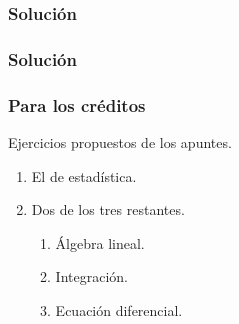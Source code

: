 \documentclass[12pt]{beamer}
\begin{document}
\begin{frame}\frametitle{Solución}
\testcode
\end{frame}


\begin{frame}
  \frametitle{Solución}
  \begin{figure}[h]
    \centering{}
  \end{figure}

\end{frame}

\begin{frame}
  \frametitle{Para los créditos}
  Ejercicios propuestos de los apuntes.
  \begin{enumerate}
  \item El de estadística.
  \item Dos de los tres restantes.
    \begin{enumerate}
    \item Álgebra lineal.
    \item Integración.
    \item Ecuación diferencial.
    \end{enumerate}
  \end{enumerate}
\end{frame}
\end{document}
